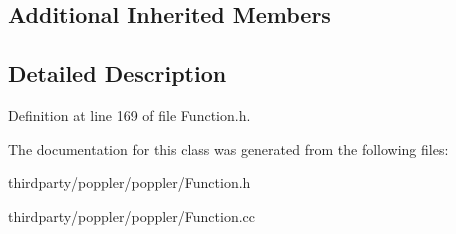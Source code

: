 \subsection*{Additional Inherited Members}


\subsection{Detailed Description}


Definition at line 169 of file Function.\+h.



The documentation for this class was generated from the following files\+:\begin{DoxyCompactItemize}
\item 
thirdparty/poppler/poppler/Function.\+h\item 
thirdparty/poppler/poppler/Function.\+cc\end{DoxyCompactItemize}
